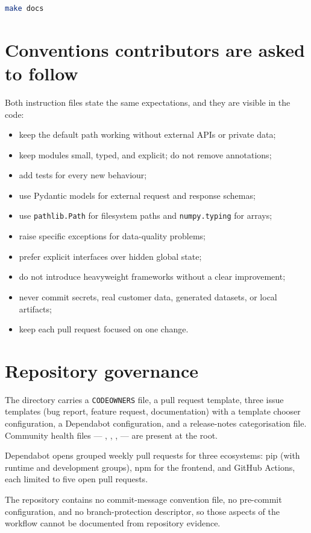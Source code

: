 \begin{lstlisting}[language=bash]
make docs
\end{lstlisting}

\section{Conventions contributors are asked to follow}

Both instruction files state the same expectations, and they are visible in the
code:

\begin{itemize}[nosep]
  \item keep the default path working without external APIs or private data;
  \item keep modules small, typed, and explicit; do not remove annotations;
  \item add tests for every new behaviour;
  \item use Pydantic models for external request and response schemas;
  \item use \texttt{pathlib.Path} for filesystem paths and
    \texttt{numpy.typing} for arrays;
  \item raise specific exceptions for data-quality problems;
  \item prefer explicit interfaces over hidden global state;
  \item do not introduce heavyweight frameworks without a clear improvement;
  \item never commit secrets, real customer data, generated datasets, or local
    artifacts;
  \item keep each pull request focused on one change.
\end{itemize}

\section{Repository governance}

The  directory carries a \texttt{CODEOWNERS} file, a pull
request template, three issue templates (bug report, feature request,
documentation) with a template chooser configuration, a Dependabot
configuration, and a release-notes categorisation file. Community health files
--- , ,
,  --- are present at the root.

Dependabot opens grouped weekly pull requests for three ecosystems: pip
(with runtime and development groups), npm for the frontend, and GitHub
Actions, each limited to five open pull requests.

The repository contains no commit-message convention file, no pre-commit
configuration, and no branch-protection descriptor, so those aspects of the
workflow cannot be documented from repository evidence.

\noevidence
